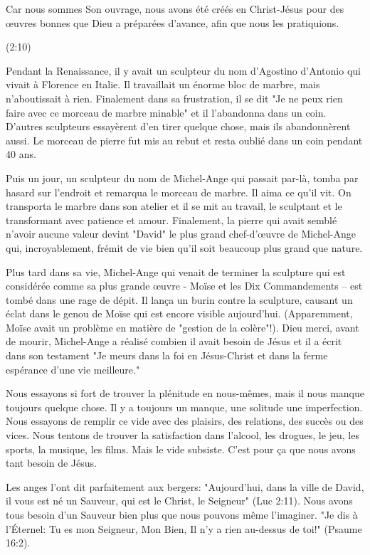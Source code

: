 
\epigraph{%
Car nous sommes Son ouvrage, nous avons été créés en Christ-Jésus pour des œuvres bonnes que Dieu a préparées d'avance, afin que nous les pratiquions.}{(2:10)}

Pendant la Renaissance, il y avait un sculpteur du nom d'Agostino d'Antonio qui vivait à Florence en Italie. Il travaillait un énorme bloc de marbre, mais n'aboutissait à rien. Finalement dans sa frustration, il se dit "Je ne peux rien faire avec ce morceau de marbre minable" et il l'abandonna dans un coin. D'autres sculpteurs essayèrent d'en tirer quelque chose, mais ils abandonnèrent aussi. Le morceau de pierre fut mis au rebut et resta oublié dans un coin pendant 40 ans.

Puis un jour, un sculpteur du nom de Michel-Ange qui passait par-là, tomba par hasard sur l'endroit et remarqua le morceau de marbre. Il aima ce qu'il vit. On transporta le marbre dans son atelier et il se mit au travail, le sculptant et le transformant avec patience et amour. Finalement, la pierre qui avait semblé n'avoir aucune valeur devint       "David" le plus grand chef-d'œuvre de Michel-Ange qui, incroyablement, frémit de vie bien qu'il soit beaucoup plus grand que nature.

Plus tard dans sa vie, Michel-Ange qui venait de terminer la sculpture qui est considérée comme sa plus grande œuvre - Moïse et les Dix Commandements – est tombé dans une rage de dépit. Il lança un burin contre la sculpture, causant un éclat dans le genou de Moïse qui est encore visible aujourd'hui. (Apparemment, Moïse avait un problème en matière de "gestion de la colère"!). Dieu merci, avant de mourir, Michel-Ange a réalisé combien il avait besoin de Jésus et il a écrit dans son testament "Je meurs dans la foi en Jésus-Christ et dans la ferme espérance d'une vie meilleure."

Nous essayons si fort de trouver la plénitude en nous-mêmes, mais il nous manque toujours quelque chose. Il y a toujours un manque, une solitude une imperfection. Nous essayons de remplir ce vide avec des plaisirs, des relations, des succès ou des vices. Nous tentons de trouver la satisfaction dans l'alcool, les drogues, le jeu, les sports, la musique, les films. Mais le vide subsiste. C'est pour ça que nous avons tant besoin de Jésus.

Les anges l'ont dit parfaitement aux bergers:  "Aujourd'hui, dans la ville de David, il vous est né un Sauveur, qui est le Christ, le Seigneur" (Luc 2:11). Nous avons tous besoin d'un Sauveur bien plus que nous pouvons même l'imaginer. "Je dis à l'Éternel: Tu es mon Seigneur, Mon Bien, Il n'y a rien au-dessus de toi!" (Psaume 16:2).

